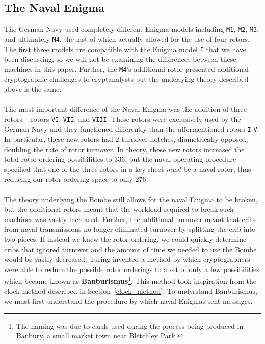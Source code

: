 \subsection{The Naval Enigma}
The German Navy used completely different Enigma models including
\texttt{M1}, \texttt{M2}, \texttt{M3}, and ultimately \texttt{M4},
the last of which actually allowed for the use of four rotors. The
first three models are compatible with the Enigma model \texttt{I}
that we have been discussing, so we will not be examining the
differences between these machines in this paper. Further, the
\texttt{M4}'s additional rotor presented additional cryptographic
challenges to cryptanalysts but the underlying theory described above
is the same.
\\\\The most important difference of the Naval Enigma was the
addition of three rotors -- rotors \texttt{VI}, \texttt{VII}, and
\texttt{VIII}. These rotors were exclusively used by the German Navy
and they functioned differently than the afformentioned rotors
\texttt{I}-\texttt{V}. In particular, these new rotors had $2$
turnover notches, diametrically opposed, doubling the rate of rotor
turnover. In theory, these new rotors increased the total rotor
ordering possibilities to $336$, but the naval operating procedure
specified that one of the three rotors in a key sheet \emph{must} be
a naval rotor, thus reducing our rotor ordering space to only $276$.
\\\\The theory underlying the Bombe still allows for the naval Enigma
to be broken, but the additional rotors meant that the workload
required to break such machines was vastly increased. Further, the
additional turnover meant that cribs from naval transmissions no
longer eliminated turnover by splitting the crib into two pieces. If
instead we knew the rotor ordering, we could quickly determine cribs
that ignored turnover and the amount of time we needed to use the
Bombe would be vastly decreased. Turing invented a method by which
cryptographers
were able to reduce the possible rotor orderings to a set of only a
few possibilities which became known as {\bf{Banburismus}}\footnote{The
  naming was due to cards used during the process being produced in
Banbury, a small market town near Bletchley Park.}. This method took
inspiration from the clock method described in
Section~\ref{clock_method}. To understand Banburismus, we must first
understand the procedure by which naval Enigmas sent messages.
